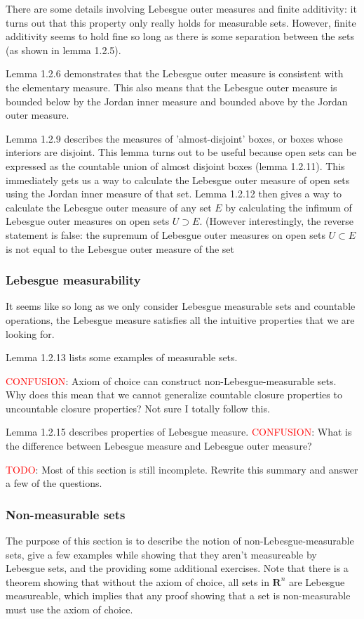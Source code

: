 \documentclass[answers,12pt]{exam}
\begin{document}
There are some details involving Lebesgue outer measures and finite additivity:
it turns out that this property only really holds for measurable sets.
However, finite additivity seems to hold fine so long as there is some separation between the sets (as shown in lemma 1.2.5).

Lemma 1.2.6 demonstrates that the Lebesgue outer measure is consistent with the elementary measure.
This also means that the Lebesgue outer measure is bounded below by the Jordan inner measure and bounded above by the Jordan outer measure.

Lemma 1.2.9 describes the measures of 'almost-disjoint' boxes, or boxes whose interiors are disjoint.
This lemma turns out to be useful because open sets can be expressed as the countable union of almost disjoint boxes (lemma 1.2.11).
This immediately gets us a way to calculate the Lebesgue outer measure of open sets using the Jordan inner measure of that set.
Lemma 1.2.12 then gives a way to calculate the Lebesgue outer measure of any set $E$ by calculating the infimum of Lebesgue outer measures on open sets $U \supset E$.
(However interestingly, the reverse statement is false: the supremum of Lebesgue outer measures on open sets $U \subset E$ is not equal to the Lebesgue outer measure of the set

\subsubsection{Lebesgue measurability}
It seems like so long as we only consider Lebesgue measurable sets and countable operations, the Lebesgue measure satisfies all the intuitive properties that we are looking for.

Lemma 1.2.13 lists some examples of measurable sets.

\textcolor{red}{CONFUSION}: Axiom of choice can construct non-Lebesgue-measurable sets.
Why does this mean that we cannot generalize countable closure properties to uncountable closure properties?
Not sure I totally follow this.

Lemma 1.2.15 describes properties of Lebesgue measure.
\textcolor{red}{CONFUSION}: What is the difference between Lebesgue measure and Lebesgue outer measure?

\textcolor{red}{TODO}: Most of this section is still incomplete.
Rewrite this summary and answer a few of the questions. 

\subsubsection{Non-measurable sets}
The purpose of this section is to describe the notion of non-Lebesgue-measurable sets, give a few examples while showing that they aren't measureable by Lebesgue sets, and the providing some additional exercises.
Note that there is a theorem showing that without the axiom of choice, all sets in $\mathbf{R}^n$ are Lebesgue measureable, which implies that any proof showing that a set is non-measurable must use the axiom of choice.
\end{document}
